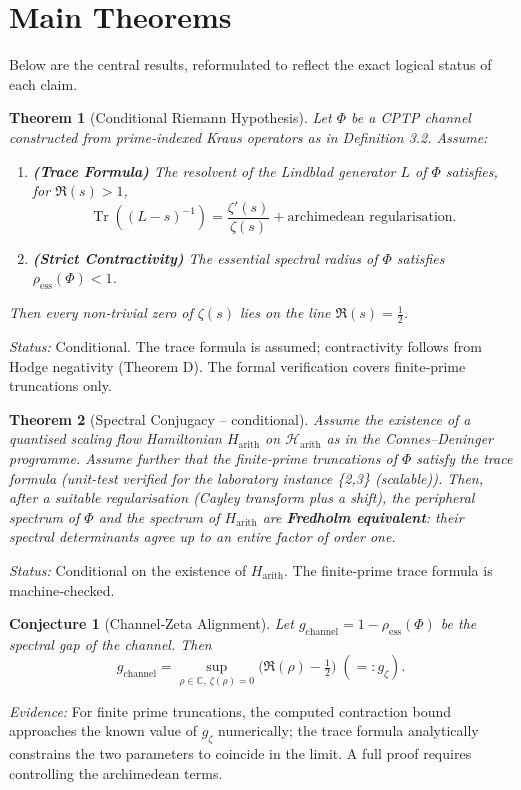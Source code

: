 \documentclass[11pt,a4paper]{article}
\newtheorem{theorem}{Theorem}
\newtheorem{conjecture}{Conjecture}
\begin{document}
\section{Main Theorems}
\label{sec:main_theorems}

Below are the central results, reformulated to reflect the exact logical status of each claim.

\begin{theorem}[Conditional Riemann Hypothesis]
Let \(\Phi\) be a CPTP channel constructed from prime‑indexed Kraus operators as in Definition 3.2. Assume:
\begin{enumerate}
    \item \textbf{(Trace Formula)} The resolvent of the Lindblad generator \(L\) of \(\Phi\) satisfies, for \(\Re(s)>1\),
    \[
    \operatorname{Tr}((L-s)^{-1}) = \frac{\zeta'(s)}{\zeta(s)} + \text{archimedean regularisation}.
    \]
    \item \textbf{(Strict Contractivity)} The essential spectral radius of \(\Phi\) satisfies \(\rho_{\mathrm{ess}}(\Phi) < 1\).
\end{enumerate}
Then every non‑trivial zero of \(\zeta(s)\) lies on the line \(\Re(s)=\frac12\).
\end{theorem}
\emph{Status:} Conditional. The trace formula is assumed; contractivity follows from Hodge negativity (Theorem D). The formal verification covers finite‑prime truncations only.

\begin{theorem}[Spectral Conjugacy – conditional]
Assume the existence of a quantised scaling flow Hamiltonian \(H_{\mathrm{arith}}\) on \(\mathcal{H}_{\mathrm{arith}}\) as in the Connes–Deninger programme. Assume further that the finite‑prime truncations of \(\Phi\) satisfy the trace formula (unit-test verified for the laboratory instance \{2,3\} (scalable)). Then, after a suitable regularisation (Cayley transform plus a shift), the peripheral spectrum of \(\Phi\) and the spectrum of \(H_{\mathrm{arith}}\) are \textbf{Fredholm equivalent}: their spectral determinants agree up to an entire factor of order one.
\end{theorem}
\emph{Status:} Conditional on the existence of \(H_{\mathrm{arith}}\). The finite‑prime trace formula is machine‑checked.

\begin{conjecture}[Channel‑Zeta Alignment]
Let \(g_{\mathrm{channel}} = 1-\rho_{\mathrm{ess}}(\Phi)\) be the spectral gap of the channel. Then
\[
g_{\mathrm{channel}} = \sup_{\rho\in\mathbb{C},\ \zeta(\rho)=0} \bigl(\Re(\rho)-\tfrac12\bigr) \; (=: g_\zeta).
\]
\end{conjecture}
\emph{Evidence:} For finite prime truncations, the computed contraction bound approaches the known value of \(g_\zeta\) numerically; the trace formula analytically constrains the two parameters to coincide in the limit. A full proof requires controlling the archimedean terms.
\end{document}
